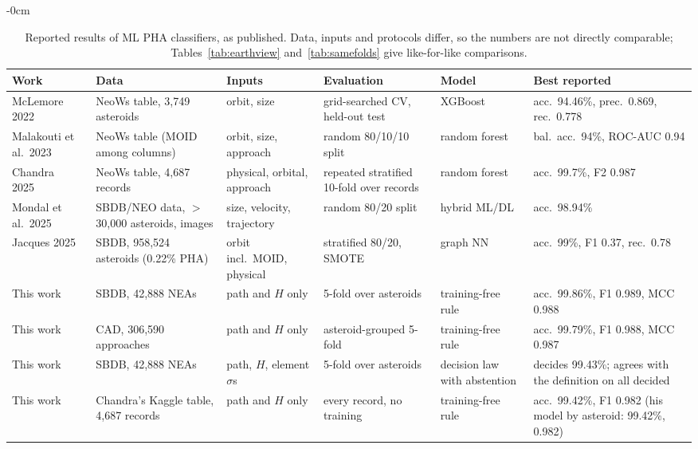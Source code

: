 \documentclass[make,article,submit,moreauthors]{Definitions/mdpi}
\begin{document}
\begin{table}[t]
\begin{adjustwidth}{-\extralength}{0cm}
\centering
\caption{Reported results of ML PHA classifiers, as published. Data, inputs and protocols differ, so the numbers are not directly comparable; Tables~\ref{tab:earthview} and~\ref{tab:samefolds} give like-for-like comparisons.}
\label{tab:literature}
\footnotesize
\setlength{\tabcolsep}{3.5pt}
\begin{tabularx}{\linewidth}{@{}>{\raggedright\arraybackslash}p{2.6cm}YYY>{\raggedright\arraybackslash}p{1.7cm}Y@{}}
\toprule
Work & Data & Inputs & Evaluation & Model & Best reported \\
\midrule
McLemore 2022~\cite{mclemore2022} & NeoWs table, 3,749 asteroids & orbit, size & grid-searched CV, held-out test & XGBoost & acc.\ 94.46\%, prec.\ 0.869, rec.\ 0.778 \\
Malakouti et al.\ 2023~\cite{malakouti2023} & NeoWs table (MOID among columns) & orbit, size, approach & random 80/10/10 split & random forest & bal.\ acc.\ 94\%, ROC-AUC 0.94 \\
Chandra 2025~\cite{chandra2025} & NeoWs table, 4,687 records & physical, orbital, approach & repeated stratified 10-fold over records & random forest & acc.\ 99.7\%, F2 0.987 \\
Mondal et al.\ 2025~\cite{mondal2025} & SBDB/NEO data, $>$30,000 asteroids, images & size, velocity, trajectory & random 80/20 split & hybrid ML/DL & acc.\ 98.94\% \\
Jacques 2025~\cite{jacques2025} & SBDB, 958,524 asteroids (0.22\% PHA) & orbit incl.\ MOID, physical & stratified 80/20, SMOTE & graph NN & acc.\ 99\%, F1 0.37, rec.\ 0.78 \\
\midrule
This work & SBDB, 42,888 NEAs & path and $H$ only & 5-fold over asteroids & training-free rule & acc.\ 99.86\%, F1 0.989, MCC 0.988 \\
This work & CAD, 306,590 approaches & path and $H$ only & asteroid-grouped 5-fold & training-free rule & acc.\ 99.79\%, F1 0.988, MCC 0.987 \\
This work & SBDB, 42,888 NEAs & path, $H$, element $\sigma$s & 5-fold over asteroids & decision law with abstention & decides 99.43\%; agrees with the definition on all decided \\
This work & Chandra's Kaggle table, 4,687 records~\cite{kaggle_nasa} & path and $H$ only & every record, no training & training-free rule & acc.\ 99.42\%, F1 0.982 (his model by asteroid: 99.42\%, 0.982) \\
\bottomrule
\end{tabularx}
\end{adjustwidth}
\end{table}
\end{document}
